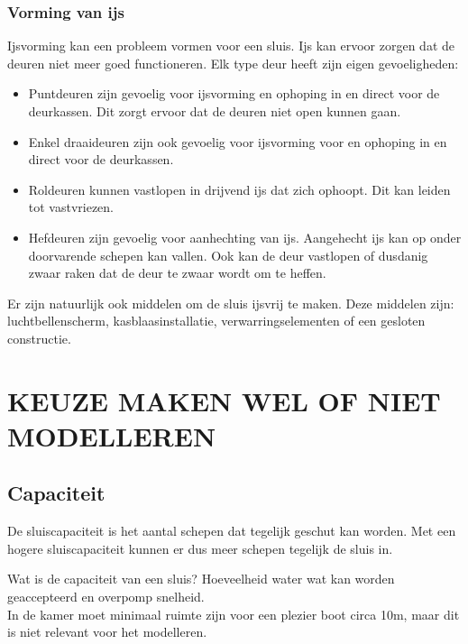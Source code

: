 \documentclass{article}
\begin{document}
\vskip0.5cm

\subsubsection{Vorming van ijs}
Ijsvorming kan een probleem vormen voor een sluis. Ijs kan ervoor zorgen dat de deuren niet meer goed functioneren. Elk type deur heeft zijn eigen gevoeligheden:
\begin{itemize}
\item Puntdeuren zijn gevoelig voor ijsvorming en ophoping in en direct voor de deurkassen. Dit zorgt ervoor dat de deuren niet open kunnen gaan.
\item Enkel draaideuren zijn ook gevoelig voor ijsvorming voor en ophoping in en direct voor de deurkassen.
\item Roldeuren kunnen vastlopen in drijvend ijs dat zich ophoopt. Dit kan leiden tot vastvriezen.
\item Hefdeuren zijn gevoelig voor aanhechting van ijs. Aangehecht ijs kan op onder doorvarende schepen kan vallen. Ook kan de deur vastlopen of dusdanig zwaar raken dat de deur te zwaar wordt om te heffen.
\end{itemize}

Er zijn natuurlijk ook middelen om de sluis ijsvrij te maken. Deze middelen zijn: luchtbellenscherm, kasblaasinstallatie, verwarringselementen of een gesloten constructie.

\vskip0.5cm

\section{\large\color{red}\textbf{KEUZE MAKEN WEL OF NIET MODELLEREN}}

\subsection{Capaciteit}
De sluiscapaciteit is het aantal schepen dat tegelijk geschut kan worden. Met een hogere sluiscapaciteit kunnen er dus meer schepen tegelijk de sluis in.

Wat is de capaciteit van een sluis? Hoeveelheid water wat kan worden geaccepteerd en overpomp snelheid.\\
In de kamer moet minimaal ruimte zijn voor een plezier boot circa 10m, maar dit is niet relevant voor het modelleren.

\clearpage
\end{document}

